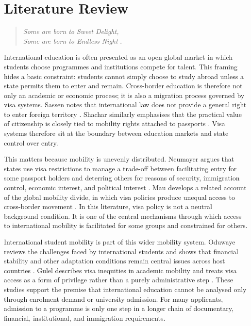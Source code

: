 \documentclass[runningheads]{llncs}
\begin{document}
\section{Literature Review}

\begin{quote}
\emph{Some are born to Sweet Delight,\\
Some are born to Endless Night} \cite{Blake1863}.
\end{quote}

International education is often presented as an open global market in which students choose programmes and institutions compete for talent. This framing hides a basic constraint: students cannot simply choose to study abroad unless a state permits them to enter and remain. Cross-border education is therefore not only an academic or economic process; it is also a migration process governed by visa systems. Sassen notes that international law does not provide a general right to enter foreign territory \cite{Sassen1996}. Shachar similarly emphasises that the practical value of citizenship is closely tied to mobility rights attached to passports \cite{Shachar2014}. Visa systems therefore sit at the boundary between education markets and state control over entry.

This matters because mobility is unevenly distributed. Neumayer argues that states use visa restrictions to manage a trade-off between facilitating entry for some passport holders and deterring others for reasons of security, immigration control, economic interest, and political interest \cite{Neumayer2006}. Mau develops a related account of the global mobility divide, in which visa policies produce unequal access to cross-border movement \cite{Mau2015}. In this literature, visa policy is not a neutral background condition. It is one of the central mechanisms through which access to international mobility is facilitated for some groups and constrained for others.

International student mobility is part of this wider mobility system. Oduwaye reviews the challenges faced by international students and shows that financial stability and other adaptation conditions remain central issues across host countries \cite{Oduwaye2023}. Gulel describes visa inequities in academic mobility and treats visa access as a form of privilege rather than a purely administrative step \cite{Gulel2025}. These studies support the premise that international education cannot be analysed only through enrolment demand or university admission. For many applicants, admission to a programme is only one step in a longer chain of documentary, financial, institutional, and immigration requirements.
\end{document}
